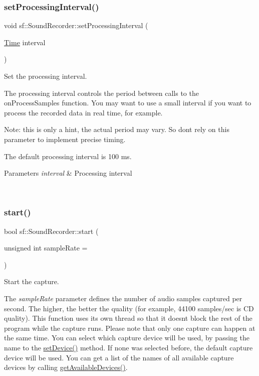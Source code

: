 \subsubsection{\texorpdfstring{setProcessingInterval()}{setProcessingInterval()}}
{\footnotesize\ttfamily void sf\+::\+Sound\+Recorder\+::set\+Processing\+Interval (\begin{DoxyParamCaption}\item[{\mbox{\hyperlink{classsf_1_1_time}{Time}}}]{interval }\end{DoxyParamCaption})\hspace{0.3cm}{\ttfamily [protected]}}



Set the processing interval. 

The processing interval controls the period between calls to the on\+Process\+Samples function. You may want to use a small interval if you want to process the recorded data in real time, for example.

Note\+: this is only a hint, the actual period may vary. So don\textquotesingle{}t rely on this parameter to implement precise timing.

The default processing interval is 100 ms.


\begin{DoxyParams}{Parameters}
{\em interval} & Processing interval \begin{DoxyVerb}\end{DoxyVerb}
 \\
\hline
\end{DoxyParams}
\mbox{\label{classsf_1_1_sound_recorder_a715f0fd2f228c83d79aaedca562ae51f}} 
\subsubsection{\texorpdfstring{start()}{start()}}
{\footnotesize\ttfamily bool sf\+::\+Sound\+Recorder\+::start (\begin{DoxyParamCaption}\item[{unsigned int}]{sample\+Rate = {} }\end{DoxyParamCaption})}



Start the capture. 

The {\itshape sample\+Rate} parameter defines the number of audio samples captured per second. The higher, the better the quality (for example, 44100 samples/sec is CD quality). This function uses its own thread so that it doesn\textquotesingle{}t block the rest of the program while the capture runs. Please note that only one capture can happen at the same time. You can select which capture device will be used, by passing the name to the \mbox{\hyperlink{classsf_1_1_sound_recorder_a8eb3e473292c16e874322815836d3cd3}{set\+Device()}} method. If none was selected before, the default capture device will be used. You can get a list of the names of all available capture devices by calling \mbox{\hyperlink{classsf_1_1_sound_recorder_a26198c5c11efcd61f426f326fe314afe}{get\+Available\+Devices()}}.


